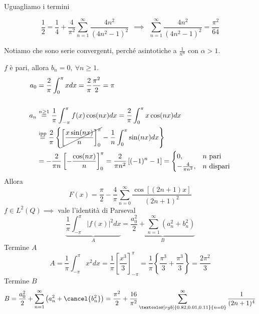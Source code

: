 \begin{enumerate}
Uguagliamo i termini

\begin{equation*}
\frac{1}{2} = \frac{1}{4} + \frac{4}{\pi^{2}}\sum\limits^{\infty}_{n = 1}\frac{4n^{2}}{\left(4n^{2} - 1\right)^{2}} \ \ \implies \ \ \sum\limits^{\infty}_{n = 1}\frac{4n^{2}}{\left(4n^{2} - 1\right)^{2}} = \frac{\pi^{2}}{64}
\end{equation*}
\end{enumerate}

\Soluzione

Notiamo che sono serie convergenti, perché asintotiche a $\frac{1}{n^{\alpha}}$ con $\alpha > 1$.

$f$ è pari, allora $b_{n} = 0, \ \forall n \geq 1$.
\begin{align*}
a_{0} & = \frac{2}{\pi}\int^{\pi}_{0} xdx = \frac{2}{\pi}\frac{\pi^{2}}{2} = \pi \\
 & \\
a_{n} & \overset{n \geq 1}{=}\frac{1}{\pi}\int^{\pi}_{- \pi} f(x)\cos(nx) dx = \frac{2}{\pi}\int^{\pi}_{0} x\cos(nx) dx\\
 & \overset{\text{ipp}}{=}\frac{2}{\pi}\left\{\cancel{\left[\frac{x\sin(nx)}{n}\right]^{\pi}_{0}} - \frac{1}{n}\int^{\pi}_{0}\sin(nx) dx\right\}\\
 & = - \frac{2}{\pi n}\left[ - \frac{\cos(nx)}{n}\right]^{\pi}_{0} = \frac{2}{\pi n^{2}}\left[(- 1)^{n} - 1\right] =
\begin{cases}
0, & n\ \text{pari}\\
- \frac{4}{\pi n^{2}}, & n\ \text{dispari}
\end{cases}
\end{align*}
Allora
\begin{equation*}
F(x) = \frac{\pi}{2} - \frac{4}{\pi}\sum\limits^{\infty}_{n = 0}\frac{\cos[(2n + 1) x]}{(2n + 1)^{2}}
\end{equation*}
$f\in L^{2}(Q) \implies $ vale l'identità di Parseval
\begin{equation*}
\underbrace{\frac{1}{\pi}\int^{\pi}_{- \pi}| f(x)|^{2} dx}_{A} = \underbrace{\frac{a^{2}_{0}}{2} + \sum\limits^{\infty}_{n = 1}\left(a^{2}_{n} + b^{2}_{n}\right)}_{B}
\end{equation*}
Termine $A$
\begin{equation*}
A = \frac{1}{\pi}\int^{\pi}_{- \pi} x^{2} dx = \frac{1}{\pi}\left[\frac{x^{3}}{3}\right]^{\pi}_{- \pi} = \frac{1}{\pi}\left\{\frac{\pi^{3}}{3} + \frac{\pi^{3}}{3}\right\} = \frac{2\pi^{2}}{3}
\end{equation*}
Termine $B$
\begin{equation*}
B = \frac{a^{2}_{0}}{2} + \sum\limits^{\infty}_{n = 1}\left(a^{2}_{n} + \cancel{b^{2}_{n}}\right) = \frac{\pi^{2}}{2} + \frac{16}{\pi^{2}}\sum\limits^{\infty}_{\textcolor[rgb]{0.82, 0.01, 0.11}{n = 0}}\frac{1}{(2n + 1)^{4}}
\end{equation*}
